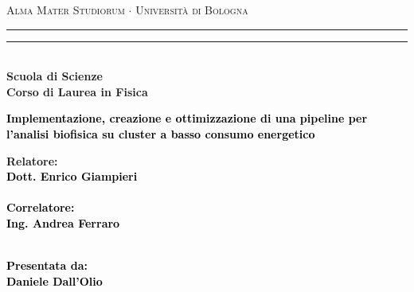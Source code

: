 \documentclass[12pt,a4paper]{report}
\begin{document}
\begin{titlepage}

%
%
%
\begin{center}
{{\Large{\textsc{Alma Mater Studiorum $\cdot$ Universit\`a di Bologna}}}}
\rule[0.1cm]{15.8cm}{0.1mm}
\rule[0.5cm]{15.8cm}{0.6mm}
\\\vspace{3mm}
%
%
{\small{\bf Scuola di Scienze \\ Corso di Laurea in Fisica}}

\end{center}

\vspace{23mm}

\begin{center}\textcolor{black}{
%
%
%
{\LARGE{\bf Implementazione, creazione e ottimizzazione di una pipeline per l'analisi biofisica su cluster a basso consumo energetico}}\\
}\end{center}

\vspace{50mm} \par \noindent

\begin{minipage}[t]{0.47\textwidth}
  {\large
    {\bf Relatore: \vspace{2mm}\\
      \textcolor{black}{
      Dott. Enrico Giampieri}\\\\

	\textcolor{black}{
	\bf Correlatore:
	\vspace{2mm}\\
	Ing. Andrea Ferraro \\\\
	}
    }
  }
\end{minipage}
%
\hfill
%
\begin{minipage}[t]{0.47\textwidth}\raggedleft \textcolor{black}{
{\large{\bf Presentata da:
\vspace{2mm}\\
Daniele Dall'Olio}}}
\end{minipage}


\end{titlepage}
\end{document}
